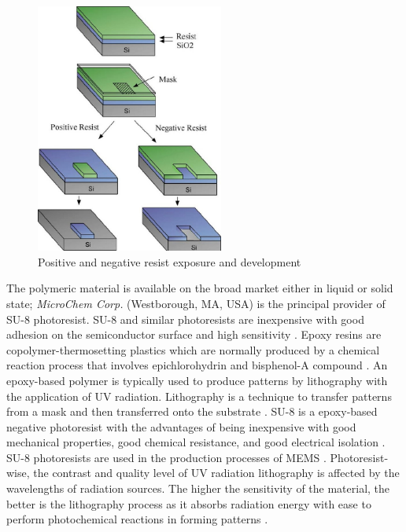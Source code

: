 \begin{figure}[th]
\centering
\includegraphics[width=0.55\textwidth]{./Figures/PosNegResist.jpg}
\decoRule
\caption[Positive and negative resist exposure and development]{Positive and negative resist exposure and development \cite{Hoggan2002}}
\label{fig:PosNegResist}
\end{figure}

The polymeric material is available on the broad market either in liquid or solid state; \emph{MicroChem Corp.} (Westborough, MA, USA) is the principal provider of SU-8 photoresist. SU-8 and similar photoresists are inexpensive with good adhesion on the semiconductor surface and high sensitivity \cite{Staab2011}. Epoxy resins are copolymer-thermosetting plastics which are normally produced by a chemical reaction process that involves epichlorohydrin and bisphenol-A compound \cite{Singla2010}. An epoxy-based polymer is typically used to produce patterns by lithography with the application of UV radiation. Lithography is a technique to transfer patterns from a mask and then transferred onto the substrate \cite{Landis2011,Xu2014}. SU-8 is a epoxy-based negative photoresist with the advantages of being inexpensive with good mechanical properties, good chemical resistance, and good electrical isolation \cite{Xu2014}. SU-8 photoresists are used in the production processes of MEMS \cite{Zhang2001}. Photoresist-wise, the contrast and quality level of UV radiation lithography is affected by the wavelengths of radiation sources. The higher the sensitivity of the material, the better is the lithography process as it absorbs radiation energy with ease to perform photochemical reactions in forming patterns \cite{Zhang2001}.

